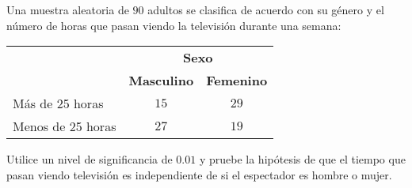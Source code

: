 \begin{enunciado}
 Una muestra aleatoria de $90$ adultos se clasifica de acuerdo con su g\'enero
 y el n\'umero de horas que pasan viendo la televisi\'on durante una semana:
 \begin{center}
  \begin{tabular}{lcc}
   & \multicolumn{2}{c}{\textbf{Sexo}} \\
   \cline{2-3}
   & \textbf{Masculino} & \textbf{Femenino} \\
   \hline 
   M\'as de 25 horas & $15$ & $29$ \\
   Menos de 25 horas & $27$ & $19$
  \end{tabular}
 \end{center}
 Utilice un nivel de significancia de $0.01$ y pruebe la hip\'otesis
 de que el tiempo que pasan viendo televisi\'on es independiente
 de si el espectador es hombre o mujer.
\end{enunciado}

